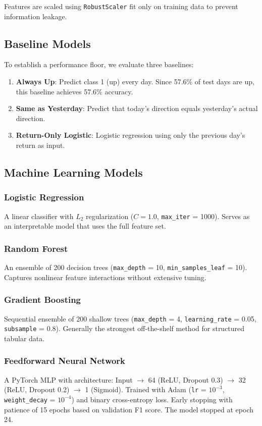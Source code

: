 \documentclass[11pt]{article}
\begin{document}
Features are scaled using \texttt{RobustScaler} fit only on training data to prevent information leakage.

\subsection{Baseline Models}

To establish a performance floor, we evaluate three baselines:

\begin{enumerate}
    \item \textbf{Always Up}: Predict class 1 (up) every day. Since 57.6\% of test days are up, this baseline achieves 57.6\% accuracy.
    \item \textbf{Same as Yesterday}: Predict that today's direction equals yesterday's actual direction.
    \item \textbf{Return-Only Logistic}: Logistic regression using only the previous day's return as input.
\end{enumerate}

\subsection{Machine Learning Models}

\subsubsection{Logistic Regression}
A linear classifier with $L_2$ regularization ($C = 1.0$, \texttt{max\_iter} = 1000). Serves as an interpretable model that uses the full feature set.

\subsubsection{Random Forest}
An ensemble of 200 decision trees (\texttt{max\_depth} = 10, \texttt{min\_samples\_leaf} = 10). Captures nonlinear feature interactions without extensive tuning.

\subsubsection{Gradient Boosting}
Sequential ensemble of 200 shallow trees (\texttt{max\_depth} = 4, \texttt{learning\_rate} = 0.05, \texttt{subsample} = 0.8). Generally the strongest off-the-shelf method for structured tabular data.

\subsubsection{Feedforward Neural Network}
A PyTorch MLP with architecture: Input $\to$ 64 (ReLU, Dropout 0.3) $\to$ 32 (ReLU, Dropout 0.2) $\to$ 1 (Sigmoid). Trained with Adam (\texttt{lr} = $10^{-3}$, \texttt{weight\_decay} = $10^{-4}$) and binary cross-entropy loss. Early stopping with patience of 15 epochs based on validation F1 score. The model stopped at epoch 24.
\end{document}
